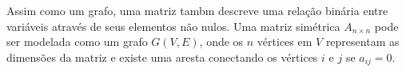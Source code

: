Assim como um grafo, uma matriz tambm descreve uma relação binária entre variáveis através de seus elementos não nulos. Uma matriz simétrica $A_{n \times n}$ pode ser modelada como um grafo $G(V, E)$, onde os $n$ vértices em $V$ representam as dimensões da matriz e existe uma aresta conectando os vértices $i$ e $j$ se $a_{ij} = 0$.
